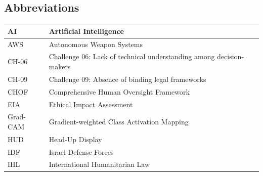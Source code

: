 \subsection*{Abbreviations}
\begin{table}[H]
	\renewcommand{\arraystretch}{1.5}
	\begin{tabular}{|l|l|}
		\hline
		AI       & Artificial Intelligence                                                                                          \\ \hline
		AWS      & Autonomous Weapon Systems                                                                                        \\ \hline
		CH-06    & Challenge 06: Lack of technical understanding among decision-makers \citep{khan2021ethicsaisystematicliterature} \\ \hline
		CH-09    & Challenge 09: Absence of binding legal frameworks \citep{khan2021ethicsaisystematicliterature}                   \\ \hline
		CHOF     & Comprehensive Human Oversight Framework \citep{info12090385}                                                     \\ \hline
		EIA      & Ethical Impact Assessment                                                                                        \\ \hline
		Grad-CAM & Gradient-weighted Class Activation Mapping                                                                       \\ \hline
		HUD      & Head-Up Display                                                                                                  \\ \hline
		IDF      & Israel Defense Forces                                                                                            \\ \hline
		IHL      & International Humanitarian Law                                                                                   \\ \hline

\end{tabular}
\end{table}
